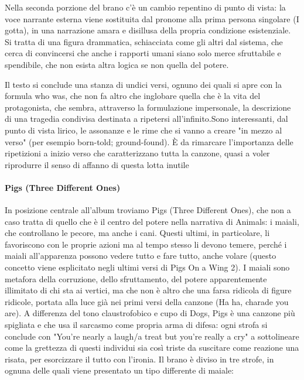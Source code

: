 \documentclass[class=book, crop=false, oneside, 12pt]{standalone}
\begin{document}
Nella seconda porzione del brano c'è un cambio repentino di punto di vista: la voce narrante esterna viene sostituita dal pronome alla prima persona singolare (I gotta), in una narrazione amara e disillusa della propria condizione esistenziale. Si tratta di una figura drammatica, schiacciata come gli altri dal sistema, che cerca di convincersi che anche i rapporti umani siano solo merce sfruttabile e spendibile, che non esista altra logica se non quella del potere.

Il testo si conclude una stanza di undici versi, ognuno dei quali si apre con la formula who was, che non fa altro che inglobare quella che è la vita del protagonista, che sembra, attraverso la formulazione impersonale, la descrizione di una tragedia condivisa destinata a ripetersi all'infinito.Sono interessanti, dal punto di vista lirico, le assonanze e le rime che si vanno a creare "in mezzo al verso" (per esempio born-told; ground-found). È da rimarcare l'importanza delle ripetizioni a inizio verso che caratterizzano tutta la canzone, quasi a voler riprodurre il senso di affanno di questa lotta inutile

\paragraph{Pigs (Three Different Ones)}
In posizione centrale all'album troviamo Pigs (Three Different Ones), che non a caso tratta di quello che è il centro del potere nella narrativa di Animals: i maiali, che controllano le pecore, ma anche i cani. Questi ultimi, in particolare, li favoriscono con le proprie azioni ma al tempo stesso li devono temere, perché i maiali all'apparenza possono vedere tutto e fare tutto, anche volare (questo concetto viene esplicitato negli ultimi versi di Pigs On a Wing 2). I maiali sono metafora della corruzione, dello sfruttamento, del potere apparentemente illimitato di chi sta ai vertici, ma che non è altro che una farsa ridicola di figure ridicole, portata alla luce già nei primi versi della canzone (Ha ha, charade you are). A differenza del tono claustrofobico e cupo di Dogs, Pigs è una canzone più spigliata e che usa il sarcasmo come propria arma di difesa: ogni strofa si conclude con "You're nearly a laugh/a treat but you're really a cry" a sottolineare come la grettezza di questi individui sia così triste da suscitare come reazione una risata, per esorcizzare il tutto con l'ironia. Il brano è diviso in tre strofe, in ognuna delle quali viene presentato un tipo differente di maiale:
\end{document}
